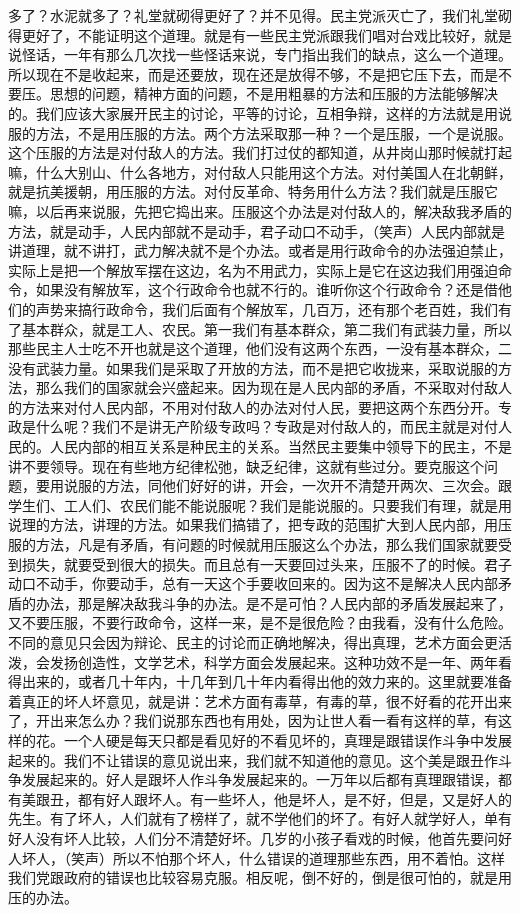 多了？水泥就多了？礼堂就砌得更好了？并不见得。民主党派灭亡了，我们礼堂砌得更好了，不能证明这个道理。就是有一些民主党派跟我们唱对台戏比较好，就是说怪话，一年有那么几次找一些怪话来说，专门指出我们的缺点，这么一个道理。所以现在不是收起来，而是还要放，现在还是放得不够，不是把它压下去，而是不要压。思想的问题，精神方面的问题，不是用粗暴的方法和压服的方法能够解决的。我们应该大家展开民主的讨论，平等的讨论，互相争辩，这样的方法就是用说服的方法，不是用压服的方法。两个方法采取那一种？一个是压服，一个是说服。这个压服的方法是对付敌人的方法。我们打过仗的都知道，从井岗山那时候就打起嘛，什么大别山、什么各地方，对付敌人只能用这个方法。对付美国人在北朝鲜，就是抗美援朝，用压服的方法。对付反革命、特务用什么方法？我们就是压服它嘛，以后再来说服，先把它捣出来。压服这个办法是对付敌人的，解决敌我矛盾的方法，就是动手，人民内部就不是动手，君子动口不动手，（笑声）人民内部就是讲道理，就不讲打，武力解决就不是个办法。或者是用行政命令的办法强迫禁止，实际上是把一个解放军摆在这边，名为不用武力，实际上是它在这边我们用强迫命令，如果没有解放军，这个行政命令也就不行的。谁听你这个行政命令？还是借他们的声势来搞行政命令，我们后面有个解放军，几百万，还有那个老百姓，我们有了基本群众，就是工人、农民。第一我们有基本群众，第二我们有武装力量，所以那些民主人士吃不开也就是这个道理，他们没有这两个东西，一没有基本群众，二没有武装力量。如果我们是采取了开放的方法，而不是把它收拢来，采取说服的方法，那么我们的国家就会兴盛起来。因为现在是人民内部的矛盾，不采取对付敌人的方法来对付人民内部，不用对付敌人的办法对付人民，要把这两个东西分开。专政是什么呢？我们不是讲无产阶级专政吗？专政是对付敌人的，而民主就是对付人民的。人民内部的相互关系是种民主的关系。当然民主要集中领导下的民主，不是讲不要领导。现在有些地方纪律松弛，缺乏纪律，这就有些过分。要克服这个问题，要用说服的方法，同他们好好的讲，开会，一次开不清楚开两次、三次会。跟学生们、工人们、农民们能不能说服呢？我们是能说服的。只要我们有理，就是用说理的方法，讲理的方法。如果我们搞错了，把专政的范围扩大到人民内部，用压服的方法，凡是有矛盾，有问题的时候就用压服这么个办法，那么我们国家就要受到损失，就要受到很大的损失。而且总有一天要回过头来，压服不了的时候。君子动口不动手，你要动手，总有一天这个手要收回来的。因为这不是解决人民内部矛盾的办法，那是解决敌我斗争的办法。是不是可怕？人民内部的矛盾发展起来了，又不要压服，不要行政命令，这样一来，是不是很危险？由我看，没有什么危险。不同的意见只会因为辩论、民主的讨论而正确地解决，得出真理，艺术方面会更活泼，会发扬创造性，文学艺术，科学方面会发展起来。这种功效不是一年、两年看得出来的，或者几十年内，十几年到几十年内看得出他的效力来的。这里就要准备着真正的坏人坏意见，就是讲：艺术方面有毒草，有毒的草，很不好看的花开出来了，开出来怎么办？我们说那东西也有用处，因为让世人看一看有这样的草，有这样的花。一个人硬是每天只都是看见好的不看见坏的，真理是跟错误作斗争中发展起来的。我们不让错误的意见说出来，我们就不知道他的意见。这个美是跟丑作斗争发展起来的。好人是跟坏人作斗争发展起来的。一万年以后都有真理跟错误，都有美跟丑，都有好人跟坏人。有一些坏人，他是坏人，是不好，但是，又是好人的先生。有了坏人，人们就有了榜样了，就不学他们的坏了。有好人就学好人，单有好人没有坏人比较，人们分不清楚好坏。几岁的小孩子看戏的时候，他首先要问好人坏人，（笑声）所以不怕那个坏人，什么错误的道理那些东西，用不着怕。这样我们党跟政府的错误也比较容易克服。相反呢，倒不好的，倒是很可怕的，就是用压的办法。

